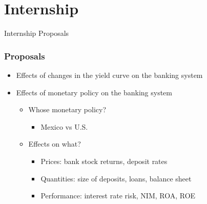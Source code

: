 \documentclass[12pt, aspectratio=169, xcolor=dvipsnames]{beamer} 			         %
\begin{document}
\section{Internship}

\begin{frame}
\begin{center}
	\huge \textcolor{yaleblue}{Internship Proposals}
\end{center}
\end{frame}

\begin{frame}
	\frametitle{Proposals}
	\begin{itemize}
		\item Effects of changes in the yield curve on the banking system
		\item Effects of monetary policy on the banking system
		\begin{itemize}
			\item Whose monetary policy?
			\begin{itemize}
				\item Mexico vs U.S.
			\end{itemize}
			\item Effects on what?
			\begin{itemize}
				\item Prices: bank stock returns, deposit rates
				\item Quantities: size of deposits, loans, balance sheet
				\item Performance: interest rate risk, NIM, ROA, ROE
			\end{itemize}
		\end{itemize}
	\end{itemize}
\end{frame}
\end{document}
